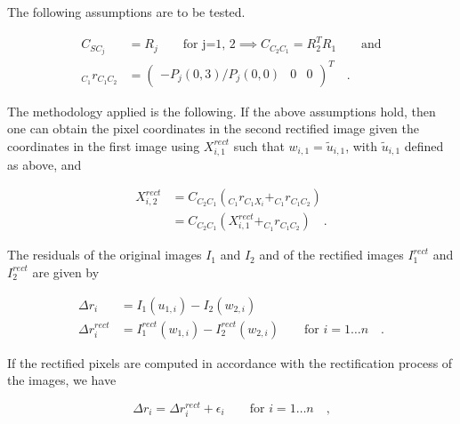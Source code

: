 The following assumptions are to be tested.

\begin{align}
  C_{SC_j} &= R_j \hspace{2em} \text{for j=1, 2} 
  \implies C_{C_2C_1} = R_2^TR_1 \hspace{2em} \text{and} \\
  _{C_1}r_{C_1C_2} &= \begin{pmatrix} -P_j(0,3)/P_j(0,0) & 0 & 0
  \end{pmatrix}^T
  \hspace{1em}\text{.}
\end{align}

The methodology applied is the following. If the above assumptions hold, then one 
can obtain the pixel coordinates in the second rectified image given the
coordinates in the first image using $X_{i,1}^{rect}$ such that $w_{i,1} = \tilde{u}_{i,1}$, with
$\tilde{u}_{i,1}$ defined as above, and 

\begin{align}
  X_{i,2}^{rect} &= C_{C_2C_1} (_{C_1}r_{C_1X_i} + _{C_1}r_{C_1C_2}) \\
                 &= C_{C_2C_1} (X_{i,1}^{rect} + _{C_1}r_{C_1C_2}) 
  \hspace{1em}\text{.}
  \label{eqn:rect/assumptions}
\end{align}

The residuals of the original images $I_1$ and $I_2$ and of
the rectified images $I_1^{rect}$ and $I_2^{rect}$ are given by

\begin{align}
  \Delta r_i &= I_1(u_{1,i}) - I_2(w_{2,i}) \\
  \Delta r_i^{rect} &= I_1^{rect}(w_{1,i}) - I_2^{rect}(w_{2,i})
  \hspace{2em} \text{for } i = 1 \ldots n 
  \hspace{1em}\text{.}
  \label{eqn:rect/res_def}
\end{align}

If the rectified pixels are computed in accordance with the rectification
process of the images, we have 

\begin{equation}
  \Delta r_i = \Delta r_i^{rect} + \epsilon_i  
  \hspace{2em} \text{for } i = 1 \ldots n
  \hspace{1em}\text{,}
  \label{eqn:rect/res_eq}
\end{equation}

